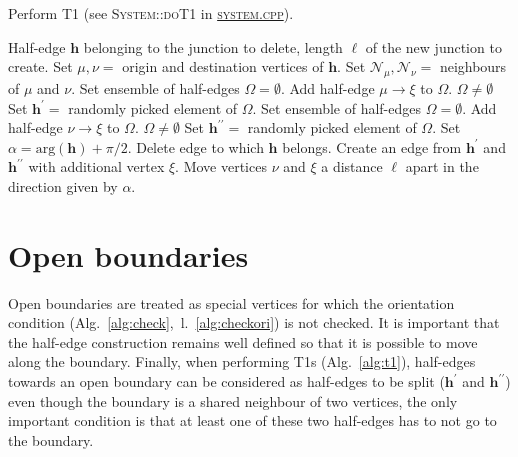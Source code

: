 \documentclass[aps, superscriptaddress, notitlepage]{revtex4-1}
\begin{document}
\begin{algorithm}[H]
\caption{Perform T1 (see \textsc{System::doT1} in \href{../system.cpp}{\textsc{system.cpp}}).}
\label{alg:t1}
\begin{algorithmic}[1]
\REQUIRE Half-edge $\boldsymbol{h}$ belonging to the junction to delete, length $\ell$ of the new junction to create.
\STATE Set $\mu, \nu =$ origin and destination vertices of $\boldsymbol{h}$.
\STATE Set $\mathcal{N}_{\mu}, \mathcal{N}_{\nu} =$ neighbours of $\mu$ and $\nu$. 
\STATE Set ensemble of half-edges $\Omega = \emptyset$.
        \STATE Add half-edge $\mu \to \xi$ to $\Omega$.
    \ENDIF
\ENDFOR
\ASSERT $\Omega \neq \emptyset$
\STATE Set $\boldsymbol{h}^{\prime} =$ randomly picked element of $\Omega$.
\STATE Set ensemble of half-edges $\Omega = \emptyset$.
        \STATE Add half-edge $\nu \to \xi$ to $\Omega$.
    \ENDIF
\ENDFOR
\ASSERT $\Omega \neq \emptyset$
\STATE Set $\boldsymbol{h}^{\prime\prime} =$ randomly picked element of $\Omega$.
\STATE Set $\alpha = \mathrm{arg}(\boldsymbol{h}) + \pi/2$.
\STATE Delete edge to which $\boldsymbol{h}$ belongs. 
\STATE Create an edge from $\boldsymbol{h}^{\prime}$ and $\boldsymbol{h}^{\prime\prime}$ with additional vertex $\xi$. 
\STATE Move vertices $\nu$ and $\xi$ a distance $\ell$ apart in the direction given by $\alpha$.
\end{algorithmic}
\end{algorithm}

\section{Open boundaries}

Open boundaries are treated as special vertices for which the orientation condition (Alg.~\ref{alg:check},~l.~\ref{alg:checkori}) is not checked. It is important that the half-edge construction remains well defined so that it is possible to move along the boundary. Finally, when performing T1s (Alg.~\ref{alg:t1}), half-edges towards an open boundary can be considered as half-edges to be split ($\boldsymbol{h}^{\prime}$ and $\boldsymbol{h}^{\prime\prime}$) even though the boundary is a shared neighbour of two vertices, the only important condition is that at least one of these two half-edges has to not go to the boundary.
\end{document}
